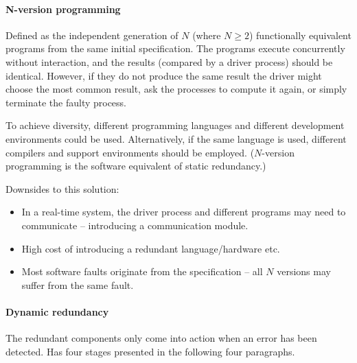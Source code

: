 \paragraph{N-version programming} Defined as the independent generation of $N$ (where $N \geq 2$) functionally equivalent programs from the same initial specification. The programs execute concurrently without interaction, and the results (compared by a driver process) should be identical. However, if they do not produce the same result the driver might choose the most common result, ask the processes to compute it again, or simply terminate the faulty process.

To achieve diversity, different programming languages and different development environments could be used. Alternatively, if the same language is used, different compilers and support environments should be employed. ($N$-version programming is the software equivalent of static redundancy.)

Downsides to this solution:
\begin{itemize}[nolistsep,noitemsep]
  \item In a real-time system, the driver process and different programs may need to communicate -- introducing a communication module.
  \item High cost of introducing a redundant language/hardware etc.
  \item Most software faults originate from the specification -- all $N$ versions may suffer from the same fault.
\end{itemize}

\paragraph{Dynamic redundancy} The redundant components only come into action when an error has been detected. Has four stages presented in the following four paragraphs.

